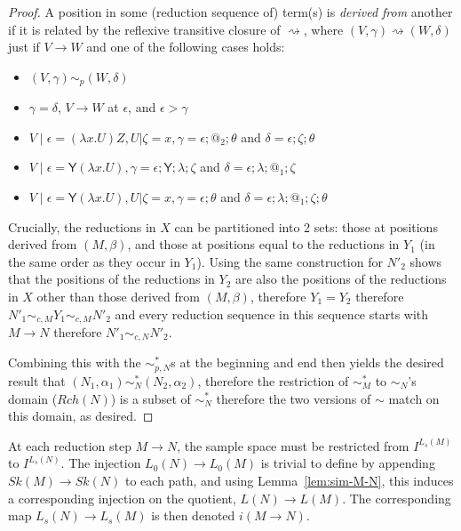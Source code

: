 \documentclass{article}
\newcommand{\tY}{\mathsf{Y}}
\theoremstyle{definition}
\newtheorem{definition}{Definition}
\theoremstyle{lemma}
\theoremstyle{remark}
\begin{document}
\begin{proof}
A position in some (reduction sequence of) term(s) is \emph{derived from} another if it is related by the reflexive transitive closure of $\rightsquigarrow$, where $(V,\gamma) \rightsquigarrow (W,\delta)$ just if $V \to W$ and one of the following cases holds:
\begin{itemize}
    \item $(V,\gamma) \sim_p (W,\delta)$
    \item $\gamma = \delta$, $V \to W$ at $\epsilon$, and $\epsilon > \gamma$
    \item $V \mid \epsilon = (\lambda x.U) Z, U | \zeta = x, \gamma = \epsilon;@_2;\theta$ and $\delta = \epsilon;\zeta;\theta$
    \item $V \mid \epsilon = \tY (\lambda x.U), \gamma = \epsilon;\tY;\lambda;\zeta$ and $\delta = \epsilon;\lambda;@_1;\zeta$
    \item $V \mid \epsilon = \tY (\lambda x.U), U | \zeta = x, \gamma = \epsilon;\theta$ and $\delta = \epsilon;\lambda;@_1;\zeta;\theta$
\end{itemize}

Crucially, the reductions in $X$ can be partitioned into 2 sets: those at positions derived from $(M,\beta)$, and those at positions equal to the reductions in $Y_1$ (in the same order as they occur in $Y_1$). Using the same construction for $N'_2$ shows that the positions of the reductions in $Y_2$ are also the positions of the reductions in $X$ other than those derived from $(M,\beta)$, therefore $Y_1 = Y_2$ therefore $N'_1 \sim_{c,M} Y_1 \sim_{c,M} N'_2$ and every reduction sequence in this sequence starts with $M \to N$ therefore $N'_1 \sim_{c,N} N'_2$.

Combining this with the $\sim_{p,N}^*$s at the beginning and end then yields the desired result that $(N_1,\alpha_1) \sim_N^* (N_2, \alpha_2)$, therefore the restriction of $\sim_M^*$ to $\sim_N$'s domain ($Rch(N)$) is a subset of $\sim_N^*$ therefore the two versions of $\sim$ match on this domain, as desired.
\end{proof}


At each reduction step $M \to N$, the sample space must be restricted from $I^{L_s(M)}$ to $I^{L_s(N)}$. 
The injection $L_0(N) \to L_0(M)$ is trivial to define by appending $Sk(M) \to Sk(N)$ to each path, and using Lemma~\ref{lem:sim-M-N}, this induces a corresponding injection on the quotient, $L(N) \to L(M)$. 
The corresponding map $L_s(N) \to L_s(M)$ is then denoted $i(M \to N)$.
\end{document}
